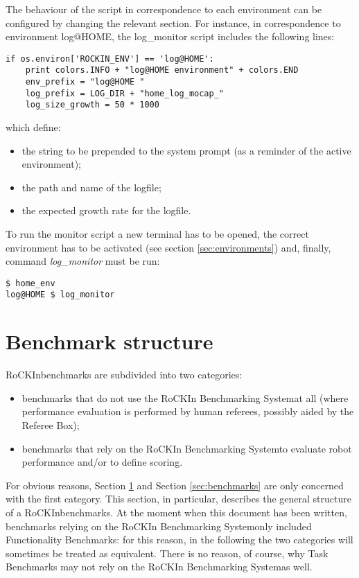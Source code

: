 \documentclass[a4paper]{article}
\newcommand{\ro}{RoCKIn}
\newcommand{\rbs}{RoCKIn Benchmarking System}
\begin{document}
The behaviour of the script in correspondence to each environment can be configured by changing the relevant section. For instance, in correspondence to environment log@HOME, the log\_monitor script includes the following lines:

\begin{verbatim}
if os.environ['ROCKIN_ENV'] == 'log@HOME':
    print colors.INFO + "log@HOME environment" + colors.END
    env_prefix = "log@HOME "
    log_prefix = LOG_DIR + "home_log_mocap_"
    log_size_growth = 50 * 1000
\end{verbatim}

which define:
\begin{itemize}
\item the string to be prepended to the system prompt (as a reminder of the active environment);
\item the path and name of the logfile;
\item the expected growth rate for the logfile.
\end{itemize}

To run the monitor script a new terminal has to be opened, the correct environment has to be activated (see section \ref{sec:environments}) and, finally, command \textit{log\_monitor} must be run:

\begin{verbatim}
$ home_env
log@HOME $ log_monitor
\end{verbatim} 

\clearpage


\section{Benchmark structure}
\label{sec:management}

\ro benchmarks are subdivided into two categories:
\begin{itemize}
\item benchmarks that do not use the \rbs at all (where performance evaluation is performed by human referees, possibly aided by the Referee Box);
\item benchmarks that rely on the \rbs to evaluate robot performance and/or to define scoring.
\end{itemize}

For obvious reasons, Section \ref{sec:management} and Section \ref{sec:benchmarks} are only concerned with the first category. This section, in particular, describes the general structure of a \ro benchmarks. At the moment when this document has been written, benchmarks relying on the \rbs only included Functionality Benchmarks: for this reason, in the following the two categories will sometimes be treated as equivalent. There is no reason, of course, why Task Benchmarks may not rely on the \rbs as well.
\end{document}
